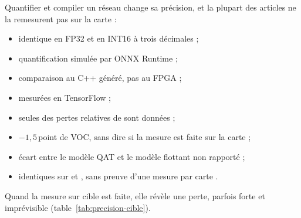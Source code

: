 Quantifier et compiler un réseau change sa précision, et la plupart des articles ne la
remesurent pas sur la carte :
\begin{itemize}
  \item {} identique en FP32 et en INT16 à trois décimales
    \citep[Table~8]{2023-zhai-fpga-vehicle-detection-tracking-accelerator} ;
  \item quantification simulée par ONNX Runtime
    \citep[§IV-A]{2023-montgomerie-corcoran-satay-streaming-architecture-toolflow-accelerating} ;
  \item comparaison au C++ généré, pas au FPGA
    \citep[§8]{arxiv-2101.05108-fast-convolutional-neural-networks-fpgas} ;
  \item {} mesurées en TensorFlow
    \citep[§5]{2019-tsukada-neural-network-device-learning-anomaly} ;
  \item seules des pertes relatives de  sont données
    \citep[§6.2]{2019-ding-req-yolo-resource-aware-efficient} ;
  \item $-1,5$\,point de  VOC, sans dire si la mesure est faite sur la carte
    \citep[Table~2]{2024-yan-fpga-yolov5-accelerator-real-time} ;
  \item écart entre le modèle QAT et le modèle flottant non rapporté
    \citep{arxiv-2609.24757-npu-accelerator-quantized-real-time}\pp ;
  \item {} identiques sur  et , sans preuve d'une mesure par carte
    \citep[§IV-C]{arxiv-2409.16808-comprehensive-evaluation-deep-learning-object}\pp.
\end{itemize}
Quand la mesure sur cible est faite, elle révèle une perte, parfois forte et imprévisible
(table~\ref{tab:precision-cible}).


